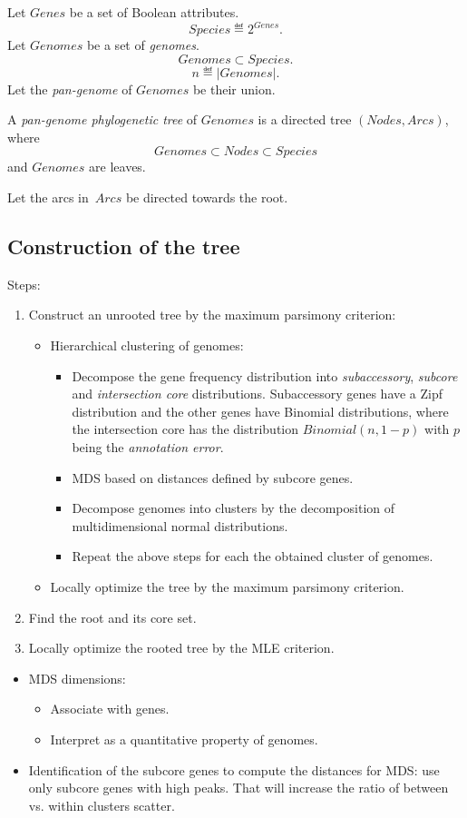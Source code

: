 \documentclass[10pt,a4paper]{article}
\theoremstyle{plain} \newtheorem{Lem}{Lemma}
\begin{document}
Let $Genes$ be a set of Boolean attributes.
$$ Species \eqdef 2^{Genes}. $$
Let $Genomes$ be a set of {\em genomes}.
$$ Genomes \subset Species. $$
$$ n \eqdef |Genomes|. $$
Let the {\em pan-genome} of $Genomes$ be their union.

A {\em pan-genome phylogenetic tree} of $Genomes$ is a directed tree $(Nodes,Arcs)$, where $$Genomes \subset Nodes \subset Species$$ and $Genomes$ are leaves.

Let the arcs in~$Arcs$ be directed towards the root.


\subsection{Construction of the tree}

Steps:
\begin{enumerate}
\item Construct an unrooted tree by the maximum parsimony criterion:
  \begin{itemize}
    \item Hierarchical clustering of genomes:
	  \begin{itemize}
	    \item Decompose the gene frequency distribution into {\em subaccessory}, {\em subcore} and {\em intersection core} distributions.
	          Subaccessory genes have a Zipf distribution and the other genes have Binomial distributions, 
	          where the intersection core has the distribution $Binomial(n,1-p)$ with $p$ being the {\em annotation error}.
	    \item MDS based on distances defined by subcore genes.
	    \item Decompose genomes into clusters by the decomposition of multidimensional normal distributions.
	    \item Repeat the above steps for each the obtained cluster of genomes.
	  \end{itemize}
   \item Locally optimize the tree by the maximum parsimony criterion.
   \end{itemize}
\item Find the root and its core set.
\item Locally optimize the rooted tree by the MLE criterion.
\end{enumerate}


\Questions
\begin{itemize}
  \item MDS dimensions: 
     \begin{itemize}
        \item Associate with genes.
        \item Interpret as a quantitative property of genomes.
     \end{itemize}
   \item Identification of the subcore genes to compute the distances for MDS: use only subcore genes with high peaks. 
         That will increase the ratio of between vs. within clusters scatter.
\end{itemize}
\end{document}
